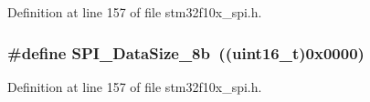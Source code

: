 Definition at line 157 of file stm32f10x\+\_\+spi.\+h.

\subsubsection[{\texorpdfstring{S\+P\+I\+\_\+\+Data\+Size\+\_\+8b}{SPI_DataSize_8b}}]{\setlength{\rightskip}{0pt plus 5cm}\#define S\+P\+I\+\_\+\+Data\+Size\+\_\+8b~(({\bf uint16\+\_\+t})0x0000)}\hypertarget{group___s_p_i__data__size_ga56721814a935922b6ca7c49060509765}{}\label{group___s_p_i__data__size_ga56721814a935922b6ca7c49060509765}


Definition at line 157 of file stm32f10x\+\_\+spi.\+h.

